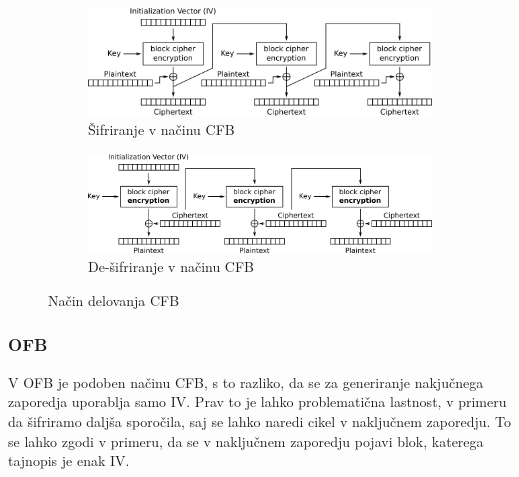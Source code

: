 \documentclass[12pt,a4paper,openany]{book}
\begin{document}
\begin{figure}[h!]
  \centering
  \begin{subfigure}[b]{\textwidth}
    \includegraphics[width=\textwidth]{images/CFB_encryption}
    \caption{Šifriranje v načinu CFB}
\label{fig:cbcenc}
  \end{subfigure}
  \begin{subfigure}[b]{\textwidth}
    \includegraphics[width=\textwidth]{images/CFB_decryption}
    \caption{De-šifriranje v načinu CFB}
\label{fig:cbcdec}
  \end{subfigure}
  \caption{Način delovanja \gls{CFB}}
\label{fig:cfbmode}
\end{figure}



\subsubsection{OFB}
\label{subs:OFB}

V \gls{OFB} je podoben načinu \gls{CFB}, s to razliko, da se za generiranje nakjučnega zaporedja uporablja samo \gls{IV}. Prav to je lahko problematična lastnost, v primeru da šifriramo daljša sporočila, saj se lahko naredi cikel v naključnem zaporedju. To se lahko zgodi v primeru, da se v naključnem zaporedju pojavi blok, katerega tajnopis je enak IV.\@
\end{document}
